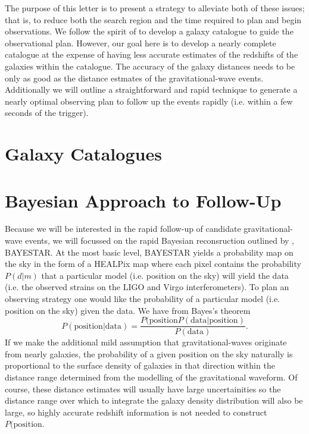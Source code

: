 \documentclass[useAMS,usenatbib]{mn2e}
\begin{document}
The purpose of this letter is to present a strategy to alleviate both
of these issues; that is, to reduce both the search region and the
time required to plan and begin observations.  We follow the spirit of
\citet{2015arXiv150803608G} to develop a galaxy catalogue to guide the
observational plan.  However, our goal here is to develop a nearly
complete catalogue at the expense of having less accurate estimates of
the redshifts of the galaxies within the catalogue.  The accuracy of
the galaxy distances needs to be only as good as the distance estmates
of the gravitational-wave events.  Additionally we will outline a
straightforward and rapid technique to generate a nearly optimal
observing plan to follow up the events rapidly (i.e. within a few
seconds of the trigger). 

\section{Galaxy Catalogues}

\section{Bayesian Approach to Follow-Up}

Because we will be interested in the rapid follow-up of candidate
gravitational-wave events, we will focussed on the rapid Bayesian
reconsruction outlined by \citet{2015arXiv150803634S}, BAYESTAR.
At the most basic level, BAYESTAR yields a probability map on the sky
in the form of a HEALPix map where each pixel contains the probability
$P(d|m)$ that a particular model (i.e. position on the sky) will yield
the data (i.e. the observed strains on the LIGO and Virgo
interferometers).  To plan an observing strategy one would like the
probability of a particular model (i.e. position on the sky) given the
data.  We have from Bayes's theorem
\begin{equation}
  P(\mathrm{position}|\mathrm{data}) = \frac{P(\mathrm{position}
    P(\mathrm{data}|\mathrm{position})}{P(\mathrm{data})}.
  \label{eq:1}
\end{equation}
If we make the additional mild assumption that gravitational-waves
originate from nearly galaxies, the probability of a given position on
the sky naturally is proportional to the surface density of galaxies
in that direction within the distance range determined from the
modelling of the gravitational waveform.  Of course, these distance
estimates will usually have large uncertainities so the distance range
over which to integrate the galaxy density distribution will also be
large, so highly accurate redshift information is not needed to
construct $P(\mathrm{position}$.
\end{document}
